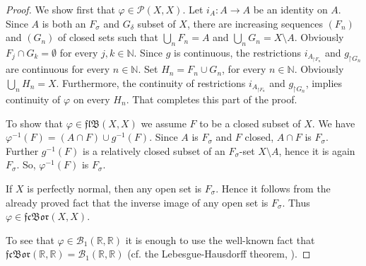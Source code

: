 \documentclass{amsart}
\theoremstyle{definition}
\newcommand\mR{{\mathbb R}}
\newcommand\mN{{\mathbb N}}
\newcommand\restr{\mathord{\restriction}}
\newcommand\B{{\mathscr B}}
\newcommand\PC{{\mathscr{P}}}
\newcommand\cn{\colon}
\newcommand\fs{F_\sigma}
\newcommand\gd{G_\delta}
\newcommand\fcb{\mathfrak{fcBor}}
\newcommand\flb{\mathfrak{flB}}
\newcommand\fii{{\varphi}}
\begin{document}
\begin{proof}
We show first that $\fii\in\PC(X,X)$. Let $i_A\cn A\to A$ be an identity on $A$.
Since $A$ is both an $\fs$ and $\gd$ subset of $X$, there are increasing sequences $(F_n)$ and $(G_n)$ of closed sets such that
$\bigcup_{n}F_n=A$ and $\bigcup_{n}G_n=X\setminus A$. Obviously $F_j\cap G_k=\emptyset$ for every $j,k\in\mN$. Since $g$ is continuous,
the restrictions $i_{A_{\restr F_n}}$ and $g_{\restr G_n}$ are continuous for every $n\in\mN$. Set $H_n=F_n\cup G_n$, for every $n\in\mN$. Obviously
$\bigcup_n{H_n}=X$. Furthermore, the continuity of restrictions
$i_{A_{\restr F_n}}$ and $g_{\restr G_n}$, implies continuity of $\fii$ on every $H_n$. That completes this part of the proof.

To show that $\fii\in\flb(X,X)$ we assume $F$ to be a closed subset of $X$. We have $\fii^{-1}(F)=(A\cap F)\cup g^{-1}(F)$.
Since $A$ is $\fs$ and $F$ closed, $A\cap F$ is $\fs$. Further $g^{-1}(F)$ is a relatively closed subset of an $\fs$-set $X\setminus A$, hence it is again
$\fs$. So, $\fii^{-1}(F)$ is $\fs$.

If $X$ is perfectly normal, then any open set is $\fs$. Hence it follows from the already proved fact that the inverse image
of any open set is $\fs$. Thus $\fii\in\fcb(X,X)$.

To see that $\fii\in\B_1(\mR,\mR)$ it is enough to use the well-known fact that $\fcb(\mR,\mR)=\B_1(\mR,\mR)$ (cf. the Lebesgue-Hausdorff theorem,
\cite[$\S$31, Section IX]{Kur}).
\end{proof}
\end{document}
